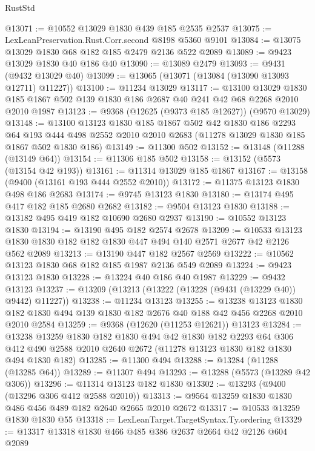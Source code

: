 \begin{lexlean}{RustStd}
\begin{coremodule}
@13071 := @10552 @13029 @1830 @439 @185 @2535 @2537
@13075 := LexLeanPreservation.Rust.Corr.second @8198 @5360 @9101
@13084 := @13075 @13029 @1830 @68 @182 @185 @2479 @2136 @522 @2089
@13089 := @9423 @13029 @1830 @40 @186 @40
@13090 := @13089 @2479
@13093 := @9431 (@9432 @13029 @40)
@13099 := @13065 (@13071 (@13084 (@13090 @13093 @12711) @11227))
@13100 := @11234 @13029
@13117 := @13100
    @13029
    @1830
    @185
    @1867
    @502
    @139
    @1830
    @186
    @2687
    @40
    @241
    @42
    @68
    @2268
    @2010
    @2010
    @1987
@13123 := @9368 (@12625 (@9373 @185 @12627)) (@9570 @13029)
@13148 := @13100
    @13123
    @1830
    @185
    @1867
    @502
    @42
    @1830
    @186
    @2293
    @64
    @193
    @444
    @498
    @2552
    @2010
    @2010
    @2683
    (@11278 @13029 @1830 @185 @1867 @502 @1830 @186)
@13149 := @11300 @502
@13152 := @13148 (@11288 (@13149 @64))
@13154 := @11306 @185 @502
@13158 := @13152 (@5573 (@13154 @42 @193))
@13161 := @11314 @13029 @185 @1867
@13167 := @13158 (@9400 (@13161 @193 @444 @2552 @2010))
@13172 := @11375 @13123 @1830 @498 @186 @2683
@13174 := @9745 @13123 @1830
@13180 := @13174 @495 @417 @182 @185 @2680 @2682
@13182 := @9504 @13123 @1830
@13188 := @13182 @495 @419 @182 @10690 @2680 @2937
@13190 := @10552 @13123 @1830
@13194 := @13190 @495 @182 @2574 @2678
@13209 := @10533 @13123 @1830 @1830 @182 @182 @1830 @447 @494 @140 @2571 @2677 @42 @2126 @562 @2089
@13213 := @13190 @447 @182 @2567 @2569
@13222 := @10562 @13123 @1830 @68 @182 @185 @1987 @2136 @549 @2089
@13224 := @9423 @13123 @1830
@13228 := @13224 @40 @186 @40 @1987
@13229 := @9432 @13123
@13237 := @13209 (@13213 (@13222 (@13228 (@9431 (@13229 @40)) @9442) @11227))
@13238 := @11234 @13123
@13255 := @13238
    @13123
    @1830
    @182
    @1830
    @494
    @139
    @1830
    @182
    @2676
    @40
    @188
    @42
    @456
    @2268
    @2010
    @2010
    @2584
@13259 := @9368 (@12620 (@11253 @12621)) @13123
@13284 := @13238
    @13259
    @1830
    @182
    @1830
    @494
    @42
    @1830
    @182
    @2293
    @64
    @306
    @412
    @490
    @2588
    @2010
    @2640
    @2672
    (@11278 @13123 @1830 @182 @1830 @494 @1830 @182)
@13285 := @11300 @494
@13288 := @13284 (@11288 (@13285 @64))
@13289 := @11307 @494
@13293 := @13288 (@5573 (@13289 @42 @306))
@13296 := @11314 @13123 @182 @1830
@13302 := @13293 (@9400 (@13296 @306 @412 @2588 @2010))
@13313 := @9564 @13259 @1830 @1830 @486 @456 @489 @182 @2640 @2665 @2010 @2672
@13317 := @10533 @13259 @1830 @1830 @55
@13318 := LexLeanTarget.TargetSyntax.Ty.ordering
@13329 := @13317 @13318 @1830 @466 @485 @386 @2637 @2664 @42 @2126 @604 @2089

\end{coremodule}
\end{lexlean}
